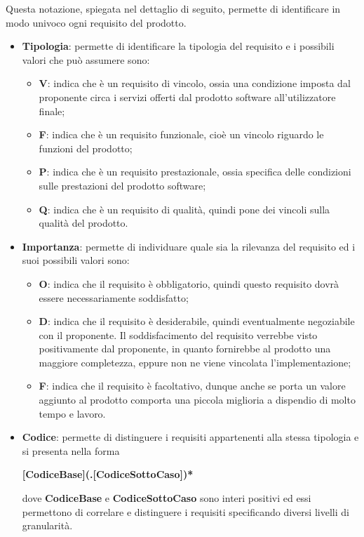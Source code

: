 Questa notazione, spiegata nel dettaglio di seguito, permette di identificare in modo univoco ogni requisito del prodotto.
\begin{itemize}
    \item \textbf{Tipologia}: permette di identificare la tipologia del requisito e i possibili valori che può assumere sono:
    \begin{itemize}
        \item \textbf{V}: indica che è un requisito di vincolo, ossia una condizione imposta dal proponente circa i servizi offerti dal
        	prodotto software all'utilizzatore finale;
        \item \textbf{F}: indica che è un requisito funzionale, cioè un vincolo riguardo le funzioni del prodotto;
        \item \textbf{P}: indica che è un requisito prestazionale, ossia specifica delle condizioni sulle prestazioni del prodotto software;
        \item \textbf{Q}: indica che è un requisito di qualità, quindi pone dei vincoli sulla qualità del prodotto.
    \end{itemize}
    \item \textbf{Importanza}: permette di individuare quale sia la rilevanza del requisito ed i suoi possibili valori sono:
    \begin{itemize}
        \item \textbf{O}: indica che il requisito è obbligatorio, quindi questo requisito dovrà essere necessariamente
        soddisfatto;
        \item \textbf{D}: indica che il requisito è desiderabile, quindi eventualmente negoziabile con il proponente.
        Il soddisfacimento del requisito verrebbe visto positivamente dal proponente, in quanto fornirebbe al prodotto
        una maggiore completezza, eppure non ne viene vincolata l'implementazione;
        \item \textbf{F}: indica che il requisito è facoltativo, dunque anche se porta un valore aggiunto al prodotto
        comporta una piccola miglioria a dispendio di molto tempo e lavoro.
    \end{itemize}

    \item \textbf{Codice}: permette di distinguere i requisiti appartenenti alla stessa tipologia e si presenta nella forma
    	\begin{center}
        	\textbf{[CodiceBase](.[CodiceSottoCaso])*}
    	\end{center}
    	dove \textbf{CodiceBase} e \textbf{CodiceSottoCaso} sono interi positivi ed essi permettono di correlare e distinguere i requisiti
    	specificando diversi livelli di granularità.
\end{itemize}


